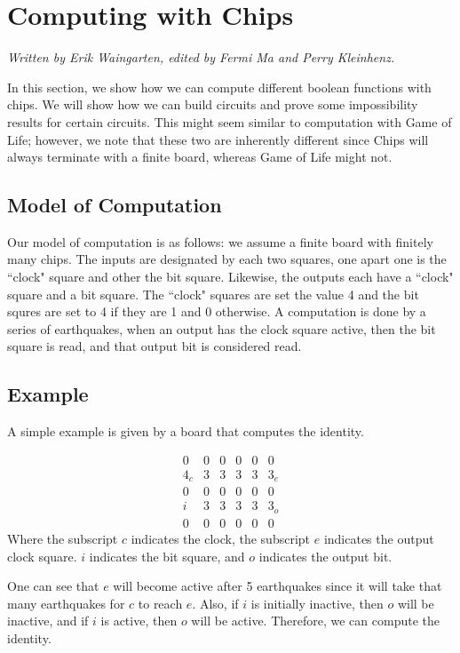 \documentclass[runningheads,a4paper]{llncs}
\begin{document}
\section{Computing with Chips}
\label{Computing with Chips}

\emph{Written by Erik Waingarten, edited by Fermi Ma and Perry Kleinhenz.}

In this section, we show how we can compute different boolean functions with chips. We will show how we can build circuits and prove some impossibility results for certain circuits. This might seem similar to computation with Game of Life; however, we note that these two are inherently different since Chips will always terminate with a finite board, whereas Game of Life might not.

\subsection{Model of Computation}

Our model of computation is as follows: we assume a finite board with finitely many chips. The inputs are designated by each two squares, one apart one is the ``clock" square and other the bit square. Likewise, the outputs each have a ``clock" square and a bit square. The ``clock" squares are set the value 4 and the bit squres are set to 4 if they are 1 and 0 otherwise. A computation is done by a series of earthquakes, when an output has the clock square active, then the bit square is read, and that output bit is considered read. 

\subsection{Example}

A simple example is given by a board that computes the identity.

\[ \begin{array}{cccccc} 0 & 0 & 0 & 0 & 0 & 0 \\
				     4_c & 3 & 3 & 3 & 3 & 3_e \\
				     0 & 0 & 0 & 0 & 0 & 0 \\
				     i  & 3 & 3 & 3 & 3 & 3_o \\
				     0 & 0 & 0 & 0 & 0 & 0 \end{array} \]
Where the subscript $c$ indicates the clock, the subscript $e$ indicates the output clock square. $i$ indicates the bit square, and $o$ indicates the output bit. 

One can see that $e$ will become active after 5 earthquakes since it will take that many earthquakes for $c$ to reach $e$. Also, if $i$ is initially inactive, then $o$ will be inactive, and if $i$ is active, then $o$ will be active. Therefore, we can compute the identity. 
\end{document}
